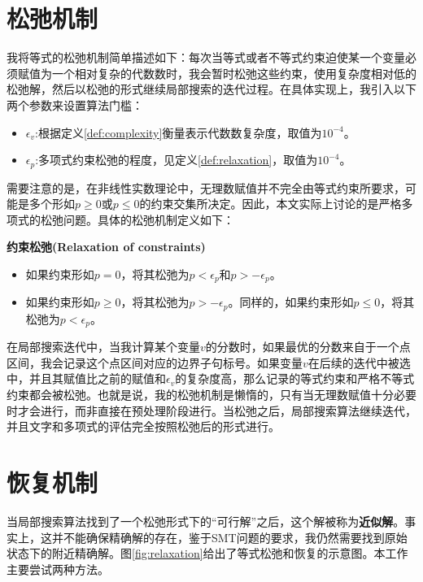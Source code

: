 \section{松弛机制}
我将等式的松弛机制简单描述如下：每次当等式或者不等式约束迫使某一个变量必须赋值为一个相对复杂的代数数时，我会暂时松弛这些约束，使用复杂度相对低的松弛解，然后以松弛的形式继续局部搜索的迭代过程。在具体实现上，我引入以下两个参数来设置算法门槛：
\begin{itemize}
    \item $\epsilon_v$:根据定义\ref{def:complexity}衡量表示代数数复杂度，取值为$10^{-4}$。
    \item $\epsilon_p$:多项式约束松弛的程度，见定义\ref{def:relaxation}，取值为$10^{-4}$。
\end{itemize}


需要注意的是，在非线性实数理论中，无理数赋值并不完全由等式约束所要求，可能是多个形如$p \ge 0$或$p \le 0$的约束交集所决定。因此，本文实际上讨论的是严格多项式的松弛问题。具体的松弛机制定义如下：

\begin{definition}{\textbf{约束松弛(Relaxation of constraints)}}
\label{def:relaxation}
\begin{itemize}
    \item 如果约束形如$p = 0$，将其松弛为$p < \epsilon_p$和$p > -\epsilon_p$。
    \item 如果约束形如$p \ge 0$，将其松弛为$p > -\epsilon_p$。同样的，如果约束形如$p \le 0$，将其松弛为$p < \epsilon_p$。
\end{itemize}
\end{definition}

在局部搜索迭代中，当我计算某个变量$v$的分数时，如果最优的分数来自于一个点区间，我会记录这个点区间对应的边界子句标号。如果变量$v$在后续的迭代中被选中，并且其赋值比之前的赋值和$\epsilon_v$的复杂度高，那么记录的等式约束和严格不等式约束都会被松弛。也就是说，我的松弛机制是懒惰的，只有当无理数赋值十分必要时才会进行，而非直接在预处理阶段进行。当松弛之后，局部搜索算法继续迭代，并且文字和多项式的评估完全按照松弛后的形式进行。


\section{恢复机制}
当局部搜索算法找到了一个松弛形式下的“可行解”之后，这个解被称为\textbf{近似解}。事实上，这并不能确保精确解的存在，鉴于SMT问题的要求，我仍然需要找到原始状态下的附近精确解。图\ref{fig:relaxation}给出了等式松弛和恢复的示意图。本工作主要尝试两种方法。

